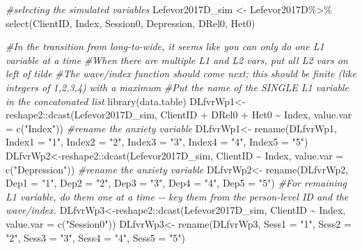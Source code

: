 \documentclass[
  11pt,
]{book}
\newenvironment{Shaded}{\begin{snugshade}}{\end{snugshade}}
\newcommand{\AttributeTok}[1]{\textcolor[rgb]{0.77,0.63,0.00}{#1}}
\newcommand{\CommentTok}[1]{\textcolor[rgb]{0.56,0.35,0.01}{\textit{#1}}}
\newcommand{\FunctionTok}[1]{\textcolor[rgb]{0.00,0.00,0.00}{#1}}
\newcommand{\NormalTok}[1]{#1}
\newcommand{\OtherTok}[1]{\textcolor[rgb]{0.56,0.35,0.01}{#1}}
\newcommand{\SpecialCharTok}[1]{\textcolor[rgb]{0.00,0.00,0.00}{#1}}
\newcommand{\StringTok}[1]{\textcolor[rgb]{0.31,0.60,0.02}{#1}}
\begin{document}
\begin{Shaded}
\begin{Highlighting}[]
\CommentTok{\#selecting the simulated variables}
\NormalTok{Lefevor2017D\_sim }\OtherTok{\textless{}{-}}\NormalTok{ Lefevor2017D}\SpecialCharTok{\%\textgreater{}\%}
  \FunctionTok{select}\NormalTok{(ClientID, Index, Session0, Depression, DRel0, Het0)}

\CommentTok{\#In the transition from long{-}to{-}wide, it seems like you can only do one L1 variable at a time}
\CommentTok{\#When there are multiple L1 and L2 vars, put all L2 vars on left of tilde}
\CommentTok{\#The wave/index function should come next; this should be finite (like integers of 1,2,3,4) with a maximum}
\CommentTok{\#Put the name of the SINGLE L1 variable in the concatonated list}
\FunctionTok{library}\NormalTok{(data.table)}
\NormalTok{DLfvrWp1}\OtherTok{\textless{}{-}}\NormalTok{reshape2}\SpecialCharTok{::}\FunctionTok{dcast}\NormalTok{(Lefevor2017D\_sim, ClientID }\SpecialCharTok{+}\NormalTok{ DRel0 }\SpecialCharTok{+}\NormalTok{ Het0 }\SpecialCharTok{\textasciitilde{}}\NormalTok{ Index, }\AttributeTok{value.var =} \FunctionTok{c}\NormalTok{(}\StringTok{"Index"}\NormalTok{))}
\CommentTok{\#rename the anxiety variable}
\NormalTok{DLfvrWp1}\OtherTok{\textless{}{-}}  \FunctionTok{rename}\NormalTok{(DLfvrWp1, }\AttributeTok{Index1 =} \StringTok{"1"}\NormalTok{, }\AttributeTok{Index2 =} \StringTok{"2"}\NormalTok{, }\AttributeTok{Index3 =} \StringTok{"3"}\NormalTok{, }\AttributeTok{Index4 =} \StringTok{"4"}\NormalTok{, }\AttributeTok{Index5 =} \StringTok{"5"}\NormalTok{)}
\NormalTok{DLfvrWp2}\OtherTok{\textless{}{-}}\NormalTok{reshape2}\SpecialCharTok{::}\FunctionTok{dcast}\NormalTok{(Lefevor2017D\_sim, ClientID }\SpecialCharTok{\textasciitilde{}}\NormalTok{ Index, }\AttributeTok{value.var =} \FunctionTok{c}\NormalTok{(}\StringTok{"Depression"}\NormalTok{))}
\CommentTok{\#rename the anxiety variable}
\NormalTok{DLfvrWp2}\OtherTok{\textless{}{-}}  \FunctionTok{rename}\NormalTok{(DLfvrWp2, }\AttributeTok{Dep1 =} \StringTok{"1"}\NormalTok{, }\AttributeTok{Dep2 =} \StringTok{"2"}\NormalTok{, }\AttributeTok{Dep3 =} \StringTok{"3"}\NormalTok{, }\AttributeTok{Dep4 =} \StringTok{"4"}\NormalTok{, }\AttributeTok{Dep5 =} \StringTok{"5"}\NormalTok{)}
\CommentTok{\#For remaining L1 variable, do them one at a time {-}{-} key them from the person{-}level ID and the wave/index.}
\NormalTok{DLfvrWp3}\OtherTok{\textless{}{-}}\NormalTok{reshape2}\SpecialCharTok{::}\FunctionTok{dcast}\NormalTok{(Lefevor2017D\_sim, ClientID }\SpecialCharTok{\textasciitilde{}}\NormalTok{ Index, }\AttributeTok{value.var =} \FunctionTok{c}\NormalTok{(}\StringTok{"Session0"}\NormalTok{))}
\NormalTok{DLfvrWp3}\OtherTok{\textless{}{-}}  \FunctionTok{rename}\NormalTok{(DLfvrWp3, }\AttributeTok{Sess1 =} \StringTok{"1"}\NormalTok{, }\AttributeTok{Sess2 =} \StringTok{"2"}\NormalTok{, }\AttributeTok{Sess3 =} \StringTok{"3"}\NormalTok{, }\AttributeTok{Sess4 =} \StringTok{"4"}\NormalTok{, }\AttributeTok{Sess5 =} \StringTok{"5"}\NormalTok{)}

\end{Highlighting}
\end{Shaded}
\end{document}
